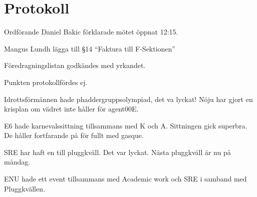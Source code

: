 \documentclass[10pt]{article}
\def\mo{Daniel Bakic}
\begin{document}
\section*{Protokoll}
\begin{paragrafer}
    Ordförande {\mo} förklarade mötet öppnat 12:15.
    
    {\valavmo}

    {\valavms}

    {\valavj}

    {\tosg}

    {\ingaadj}


    Mangus Lundh \ypa lägga till \S14 ``Faktura till F-Sektionen''

    Föredragningslistan godkändes med yrkandet.


    \ingaprot

    \begin{fyllnadsval} %
    \end{fyllnadsval}

    \begin{paragrafer}
        Punkten protokollfördes ej.

        Idrottsförmännen hade phaddergruppsolympiad, det va lyckat! Nöju har gjort en krisplan om vädret inte håller för agent00E.    

        E6 hade karnevalssittning tillsammans med K och A. Sittningen gick superbra. De håller fortfarande på för fullt med gasque.

        SRE har haft en till pluggkväll. Det var lyckat. Nästa pluggkväll är nu på måndag.

        ENU hade ett event tillsammans med Academic work och SRE i samband med Pluggkvällen.


\end{paragrafer}
\end{paragrafer}
\end{document}
